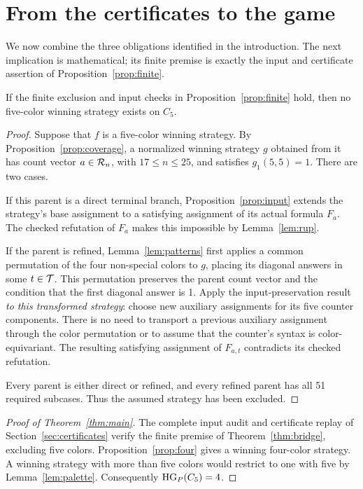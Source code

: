 \section{From the certificates to the game}\label{sec:conclusion}
We now combine the three obligations identified in the introduction.
The next implication is mathematical; its finite premise is exactly the
input and certificate assertion of Proposition~\ref{prop:finite}.

\begin{theorem}\label{thm:bridge}
If the finite exclusion and input checks in
Proposition~\ref{prop:finite} hold, then no five-color winning strategy
exists on $C_5$.
\end{theorem}
\begin{proof}
Suppose that $f$ is a five-color winning strategy. By
Proposition~\ref{prop:coverage}, a normalized winning strategy $g$ obtained
from it has count vector $a\in\mathcal{R}_n$, with $17\leq n\leq25$, and
satisfies $g_1(5,5)=1$. There are two cases.

If this parent is a direct terminal branch,
Proposition~\ref{prop:input} extends the strategy's base assignment to a
satisfying assignment of its actual formula $F_a$. The checked refutation
of $F_a$ makes this impossible by Lemma~\ref{lem:rup}.

If the parent is refined, Lemma~\ref{lem:patterns} first applies a
common permutation of the four non-special colors to $g$, placing
its diagonal answers in some $t\in\mathcal{T}$. This permutation preserves the
parent count vector and the condition that the first diagonal answer is 1.
Apply the input-preservation result
\emph{to this transformed strategy}: choose new auxiliary assignments
for its five counter components. There is no need to transport a previous
auxiliary assignment through the color permutation or to assume that the
counter's syntax is color-equivariant. The resulting satisfying assignment
of $F_{a,t}$ contradicts its checked refutation.

Every parent is either direct or refined, and every refined parent has
all 51 required subcases. Thus the assumed strategy has been excluded.
\end{proof}

\begin{proof}[Proof of Theorem~\ref{thm:main}]
The complete input audit and certificate replay of
Section~\ref{sec:certificates} verify the finite premise of
Theorem~\ref{thm:bridge}, excluding five colors. Proposition~\ref{prop:four}
gives a winning four-color strategy. A winning strategy with more than
five colors would restrict to one with five by Lemma~\ref{lem:palette}.
Consequently $\operatorname{HG}_{P}(C_5)=4$.
\end{proof}

